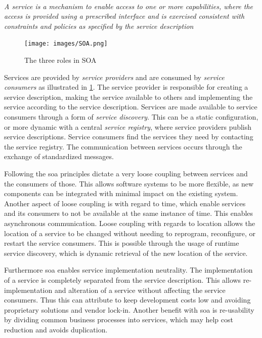\paragraph{}
\textit{
A service is a mechanism to enable access to one or more capabilities, where the
access is  provided using a prescribed interface and is exercised consistent
with constraints and policies as  specified by the service description
}

\begin{figure}[h]
\texttt{[image: images/SOA.png]}
\caption{The three roles in SOA}
\label{figure-soa-roles}
\end{figure}

Services are provided by \textit{service providers} and are consumed by
\textit{service consumers} as illustrated in \cref{figure-soa-roles}. The
service provider is responsible for creating a service description, making the
service available to others and implementing the service according to the
service description. Services are made available to service consumers through a
form of \textit{service discovery}. This can be a static configuration, or more
dynamic with a central \textit{service registry}, where service providers
publish service descriptions. Service consumers find the services they need by
contacting the service registry. The communication between services occurs
through the exchange of standardized messages.

Following the \gls{soa} principles dictate a very loose coupling between
services and the consumers of those. This allows software systems to be more
flexible, as new components can be integrated with minimal impact on the
existing system. Another aspect of loose coupling is with regard to time, which
enable services and its consumers to not be available at the same instance of
time. This enables asynchronous communication. Loose coupling with regards to
location allows the location of a service to be changed without needing to
reprogram, reconfigure, or restart the service consumers. This is possible
through the usage of runtime service discovery, which is dynamic retrieval of
the new location of the service.

Furthermore \gls{soa} enables service implementation neutrality. The
implementation of a service is completely separated from the service
description. This allows re-implementation and alteration of a service without
affecting the service consumers. Thus this can attribute to keep development
costs low and avoiding proprietary solutions and vendor lock-in. Another
benefit with \gls{soa} is re-usability by dividing common business processes
into services, which may help cost reduction and avoids duplication.

